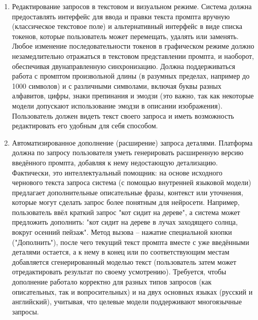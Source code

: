 \begin{enumerate}[label=\arabic*]
    \item Редактирование запросов в текстовом и визуальном режиме. Система должна предоставлять интерфейс для ввода и правки текста промпта вручную (классическое текстовое поле) и альтернативный интерфейс в виде списка токенов, которые пользователь может перемещать, удалять или заменять. Любое изменение последовательности токенов в графическом режиме должно незамедлительно отражаться в текстовом представлении промпта, и наоборот, обеспечивая двунаправленную синхронизацию. Должна поддерживаться работа с промптом произвольной длины (в разумных пределах, например до 1000 символов) и с различными символами, включая буквы разных алфавитов, цифры, знаки препинания и эмодзи (это важно, так как некоторые модели допускают использование эмодзи в описании изображения)\cite{fusionbrain:docs}. Пользователь должен видеть текст своего запроса и иметь возможность редактировать его удобным для себя способом.
    \item Автоматизированное дополнение (расширение) запроса деталями. Платформа должна по запросу пользователя уметь генерировать расширенную версию введённого промпта, добавляя к нему недостающую детализацию. Фактически, это интеллектуальный помощник: на основе исходного чернового текста запроса система (с помощью внутренней языковой модели) предлагает дополнительные описательные фразы, контекст или уточнения, которые могут сделать запрос более понятным для нейросети. Например, пользователь ввёл краткий запрос "кот сидит на дереве", а система может предложить дополнить: "кот сидит на дереве в лучах заходящего солнца, вокруг осенний пейзаж". Метод вызова – нажатие специальной кнопки ("Дополнить"), после чего текущий текст промпта вместе с уже введёнными деталями остается, а к нему в конец или по соответствующим местам добавляется сгенерированный моделью текст (пользователь затем может отредактировать результат по своему усмотрению). Требуется, чтобы дополнение работало корректно для разных типов запросов (как описательных, так и вопросительных) и на двух основных языках (русский и английский), учитывая, что целевые модели поддерживают многоязычные запросы.

\end{enumerate}
